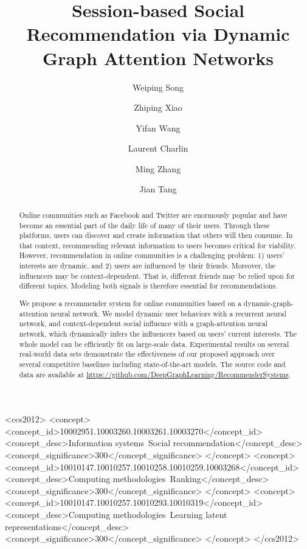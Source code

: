 \documentclass[sigconf]{acmart}
\begin{document}
\title{Session-based Social Recommendation via Dynamic Graph Attention Networks}

\author{Weiping Song}
\author{Zhiping Xiao}
\author{Yifan Wang}
\author{Laurent Charlin}
\author{Ming Zhang}
\author{Jian Tang}\authornotemark[1]

\renewcommand{\shortauthors}{W. Song et al.}

\begin{abstract}
Online communities such as Facebook and Twitter are enormously popular and have become an essential part of the daily life of many of their users. Through these platforms, users can discover and create information that others will then consume. In that context, recommending relevant information to users becomes critical for viability. However, recommendation in online communities is a challenging problem: 1) users' interests are dynamic, and 2) users are influenced by their friends. Moreover, the influencers may be context-dependent. That is, different friends may be relied upon for different topics.
Modeling both signals is therefore essential for recommendations.

We propose a recommender system for online communities based on a dynamic-graph-attention neural network. We model dynamic user behaviors with a recurrent neural network, and context-dependent social influence with a graph-attention neural network, which dynamically infers the influencers based on users' current interests.
The whole model can be efficiently fit on large-scale data. Experimental results on several real-world data sets demonstrate the effectiveness of our proposed approach over several competitive baselines including state-of-the-art models. The source code and data are available at \url{https://github.com/DeepGraphLearning/RecommenderSystems}.

\end{abstract}

\begin{CCSXML}
<ccs2012>
<concept>
<concept_id>10002951.10003260.10003261.10003270</concept_id>
<concept_desc>Information systems~Social recommendation</concept_desc>
<concept_significance>300</concept_significance>
</concept>
<concept>
<concept_id>10010147.10010257.10010258.10010259.10003268</concept_id>
<concept_desc>Computing methodologies~Ranking</concept_desc>
<concept_significance>300</concept_significance>
</concept>
<concept>
<concept_id>10010147.10010257.10010293.10010319</concept_id>
<concept_desc>Computing methodologies~Learning latent representations</concept_desc>
<concept_significance>300</concept_significance>
</concept>
</ccs2012>
\end{CCSXML}
\end{document}
